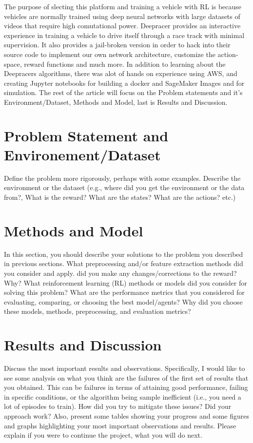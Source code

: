\documentclass[journal]{IEEEtran}
\begin{document}
The purpose of slecting this platform and training a vehicle with RL is because vehicles are normally trained using deep neural networks with large datasets of videos that require high comutational power.  Deepracer provides an interactive experience in training a vehicle to drive itself through a race track with minimal supervision.  It also provides a jail-broken version in order to hack into their source code to implement our own network architecture, customize the action-space, reward functions and much more.  In addition to learning about the Deepracers algorithms, there was alot of hands on experience using AWS, and creating Jupyter notebooks for building a docker and SageMaker Images and for simulation.  The rest of the article will focus on the Problem statements and it's Environment/Dataset, Methods and Model, last is Results and Discussion.

\section{Problem Statement and Environement/Dataset}
Define the problem more rigorously, perhaps with some examples. Describe the environment or the dataset (e.g., where did you get the environment or the data from?, What is the reward? What are the states? What are the actions? etc.)

\section{Methods and Model}
In this section, you should describe your solutions to the problem you described in previous sections. What preprocessing and/or feature extraction methods did you consider and apply. did you make any changes/corrections to the reward? Why? What reinforcement learning (RL) methods or models did you consider for solving this problem? What are the performance metrics that you considered for evaluating, comparing, or choosing the best model/agents? Why did you choose these models, methods, preprocessing, and evaluation metrics?

\section{Results and Discussion}
Discuss the most important results and observations. Specifically, I would like to see some analysis on what you think are the failures of the first set of results that you obtained. This can be failures in terms of attaining good performance, failing in specific conditions, or the algorithm being sample inefficient (i.e., you need a lot of episodes to train). How did you try to mitigate these issues?  Did your approach work? Also, present some tables showing your progress and some figures and graphs highlighting your most important observations and results. Please explain if you were to continue the project, what you will do next.
\end{document}
